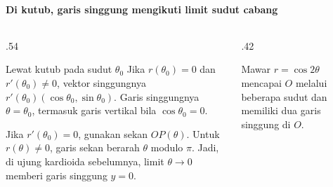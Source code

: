 \documentclass{../../kalkulus-ppt}
\newcommand{\sumbubidang}[4]{%
    \draw[sumbu] (#1,0) -- (#2,0) node[right,font=\scriptsize] {$x$};
    \draw[sumbu] (0,#3) -- (0,#4) node[above,font=\scriptsize] {$y$};
}
\begin{document}
\begin{frame}{\insertsection}
    \framesubtitle{Di kutub, garis singgung mengikuti limit sudut cabang}
    \begin{columns}[c,onlytextwidth]
        \begin{column}{.54\textwidth}
            \begin{block}{Lewat kutub pada sudut $\theta_0$}
                Jika $r(\theta_0)=0$ dan $r'(\theta_0)\ne0$,
                vektor singgungnya
                $r'(\theta_0)(\cos\theta_0,\sin\theta_0)$.
                Garis singgungnya $\theta=\theta_0$, termasuk
                garis vertikal bila $\cos\theta_0=0$.
            \end{block}
            Jika $r'(\theta_0)=0$, gunakan sekan $OP(\theta)$.
            Untuk $r(\theta)\ne0$, garis sekan berarah $\theta$
            modulo $\pi$. Jadi, di ujung kardioida sebelumnya,
            limit $\theta\to0$ memberi garis singgung $y=0$.
        \end{column}
        \begin{column}{.42\textwidth}
            \centering
            \par
            \small Mawar $r=\cos2\theta$ mencapai $O$ melalui
            beberapa sudut dan memiliki dua garis singgung di $O$.
        \end{column}
    \end{columns}
\end{frame}
\end{document}
